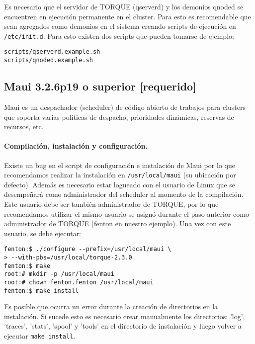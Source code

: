 \documentclass[a4paper,10pt,spanish]{article}
\begin{document}
Es necesario que el servidor de TORQUE (qserverd) y los demonios qnoded se encuentren en ejecuci\'{o}n permanente en el cluster. Para esto es recomendable que sean agregados como demonios en el sistema creando scripts de ejecuci\'{o}n en \mbox{\texttt{/etc/init.d}}. Para esto existen dos scripts que pueden tomarse de ejemplo:

\begin{verbatim}
scripts/qserverd.example.sh
scripts/qnoded.example.sh
\end{verbatim}

\subsection{Maui 3.2.6p19 o superior \small{[requerido]}}

Maui\cite{maui} es un despachador (scheduler) de c\'{o}digo abierto de trabajos para clusters que soporta varias pol\'{i}ticas de despacho, prioridades din\'{a}micas, reservas de recursos, etc.

\paragraph{Compilaci\'{o}n, instalaci\'{o}n y configuraci\'{o}n.}

Existe un bug en el script de configuraci\'{o}n e instalaci\'{o}n de Maui por lo que recomendamos realizar la instalaci\'{o}n en \mbox{\texttt{/usr/local/maui}} (su ubicaci\'{o}n por defecto). Adem\'{a}s es necesario estar logueado con el usuario de Linux que se desempe\~{n}ar\'{a} como administrador del scheduler al momento de la compilaci\'{o}n. Este usuario debe ser tambi\'{e}n administrador de TORQUE, por lo que recomendamos utilizar el mismo usuario se asign\'{o} durante el paso anterior como administrador de TORQUE (fenton en nuestro ejemplo). Una vez con este usuario, se debe ejecutar:

\begin{verbatim}
fenton:$ ./configure --prefix=/usr/local/maui \
> --with-pbs=/usr/local/torque-2.3.0
fenton:$ make 
root:# mkdir -p /usr/local/maui
root:# chown fenton.fenton /usr/local/maui
fenton:$ make install
\end{verbatim}

Es posible que ocurra un error durante la creaci\'{o}n de directorios en la instalaci\'{o}n. Si sucede esto es necesario crear manualmente los directorios: 'log', 'traces', 'stats', 'spool' y 'tools' en el directorio de instalaci\'{o}n y luego volver a ejecutar \mbox{\texttt{make install}}. 
\end{document}
